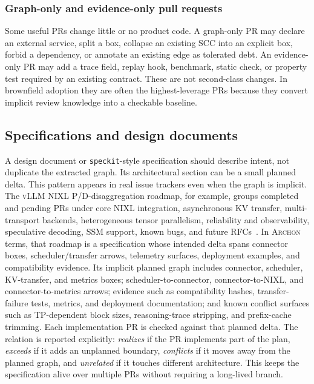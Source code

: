 \documentclass[sigconf,review,anonymous]{acmart}
\theoremstyle{plain}
\theoremstyle{definition}
\begin{document}
\subsubsection{Graph-only and evidence-only pull requests}

Some useful PRs change little or no product code. A graph-only PR may declare an
external service, split a box, collapse an existing SCC into an explicit box,
forbid a dependency, or annotate an existing edge as tolerated debt. An
evidence-only PR may add a trace field, replay hook, benchmark, static check, or
property test required by an existing contract. These are not second-class
changes. In brownfield adoption they are often the highest-leverage PRs because
they convert implicit review knowledge into a checkable baseline.

\subsection{Specifications and design documents}

A design document or \texttt{speckit}-style specification should describe intent,
not duplicate the extracted graph. Its architectural section can be a small
planned delta. This pattern appears in real issue trackers even when the graph
is implicit. The \textsc{vLLM} NIXL P/D-disaggregation roadmap, for example,
groups completed and pending PRs under core NIXL integration, asynchronous KV
transfer, multi-transport backends, heterogeneous tensor parallelism, reliability
and observability, speculative decoding, SSM support, known bugs, and future
RFCs~\cite{vllmnixlroadmap}. In \textsc{Archon} terms, that roadmap is a
specification whose intended delta spans connector boxes, scheduler/transfer
arrows, telemetry surfaces, deployment examples, and compatibility evidence. Its
implicit planned graph includes connector, scheduler, KV-transfer, and metrics
boxes; scheduler-to-connector, connector-to-NIXL, and connector-to-metrics
arrows; evidence such as compatibility hashes, transfer-failure tests, metrics,
and deployment documentation; and known conflict surfaces such as TP-dependent
block sizes, reasoning-trace stripping, and prefix-cache trimming.
Each implementation PR is checked against that planned delta. The relation is
reported explicitly: \emph{realizes} if the PR implements part of the plan,
\emph{exceeds} if it adds an unplanned boundary, \emph{conflicts} if it moves
away from the planned graph, and \emph{unrelated} if it touches different
architecture. This keeps the specification alive over multiple PRs without
requiring a long-lived branch.
\end{document}
